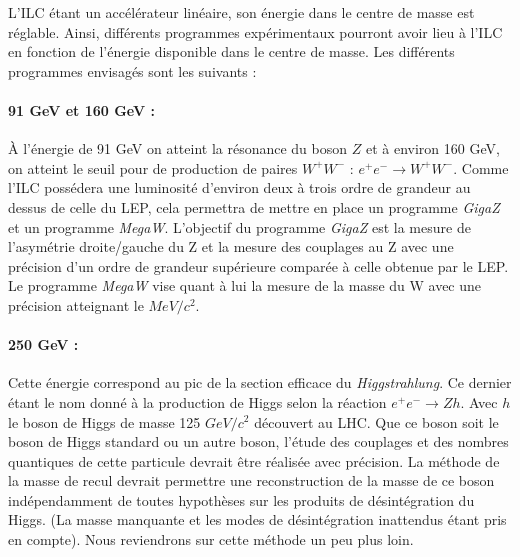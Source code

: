    \medskip
   
   L'ILC \'etant un acc\'el\'erateur lin\'eaire, son \'energie dans le centre de masse est r\'eglable. Ainsi, diff\'erents programmes exp\'erimentaux pourront avoir lieu \`a l'ILC en fonction de l'\'energie disponible dans le centre de masse. Les diff\'erents programmes envisag\'es sont les suivants :
   
   \paragraph{91 GeV et 160 GeV :} \`A l'\'energie de 91 GeV on atteint la r\'esonance du boson $Z$ et \`a environ 160 GeV, on atteint le seuil pour de production de paires $W^+ W^-$ : $e^+ e^- \rightarrow W^+ W^-$. Comme l'ILC poss\'edera une luminosit\'e d'environ deux \`a trois ordre de grandeur au dessus de celle du LEP, cela permettra de mettre en place un programme \textit{GigaZ} et un programme \textit{MegaW}. L'objectif du programme \textit{GigaZ} est la mesure de l'asym\'etrie droite/gauche du Z et la mesure des couplages au Z avec une pr\'ecision d'un ordre de grandeur sup\'erieure compar\'ee \`a celle obtenue par le LEP. Le programme \textit{MegaW} vise quant \`a lui la mesure de la masse du W avec une pr\'ecision atteignant le $MeV/c^2$.
   
   \paragraph{250 GeV :} Cette \'energie correspond au pic de la section efficace du \textit{Higgstrahlung}. Ce dernier \'etant le nom donn\'e \`a la production de Higgs selon la r\'eaction $e^+ e^- \rightarrow Z h$. Avec $h$ le boson de Higgs de masse 125 $GeV/c^2$ d\'ecouvert au LHC. Que ce boson soit le boson de Higgs standard ou un autre boson, l'\'etude des couplages et des nombres quantiques de cette particule devrait \^etre r\'ealis\'ee avec pr\'ecision. La m\'ethode de la masse de recul devrait permettre une reconstruction de la masse de ce boson ind\'ependamment de toutes hypoth\`eses sur les produits de d\'esint\'egration du Higgs. (La masse manquante et les modes de d\'esint\'egration inattendus \'etant pris en compte). Nous reviendrons sur cette m\'ethode un peu plus loin.
   
